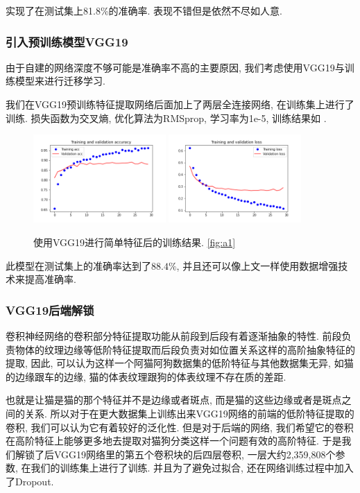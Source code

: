 \documentclass[lang=cn,11pt]{elegantpaper}
\begin{document}
实现了在测试集上81.8\%的准确率. 表现不错但是依然不尽如人意.

\subsubsection{引入预训练模型VGG19}
由于自建的网络深度不够可能是准确率不高的主要原因, 我们考虑使用VGG19与训练模型来进行迁移学习. 

我们在VGG19预训练特征提取网络后面加上了两层全连接网络, 在训练集上进行了训练. 损失函数为交叉熵, 优化算法为RMSprop, 学习率为1e-5, 训练结果如 .
\begin{figure}[htbp]
	\centering
	  \includegraphics[width=0.45\textwidth]{VGG_classify_1}
	  \includegraphics[width=0.45\textwidth]{VGG_classify_2}
	  \caption{使用VGG19进行简单特征后的训练结果. \ref{fig:a1}}
	\end{figure}

此模型在测试集上的准确率达到了$88.4\%$, 并且还可以像上文一样使用数据增强技术来提高准确率. 
\subsubsection{VGG19后端解锁}

卷积神经网络的卷积部分特征提取功能从前段到后段有着逐渐抽象的特性. 前段负责物体的纹理边缘等低阶特征提取而后段负责对如位置关系这样的高阶抽象特征的提取, 因此, 可以认为这样一个阿猫阿狗数据集的低阶特征与其他数据集无异, 如猫的边缘跟车的边缘, 猫的体表纹理跟狗的体表纹理不存在质的差距. 

也就是让猫是猫的那个特征并不是边缘或者斑点, 而是猫的这些边缘或者是斑点之间的关系. 所以对于在更大数据集上训练出来VGG19网络的前端的低阶特征提取的卷积, 我们可以认为它有着较好的泛化性. 但是对于后端的网络, 我们希望它的卷积在高阶特征上能够更多地去提取对猫狗分类这样一个问题有效的高阶特征. 于是我们解锁了后VGG19网络里的第五个卷积块的后四层卷积, 一层大约2,359,808个参数, 在我们的训练集上进行了训练. 并且为了避免过拟合, 还在网络训练过程中加入了Dropout.
\end{document}
